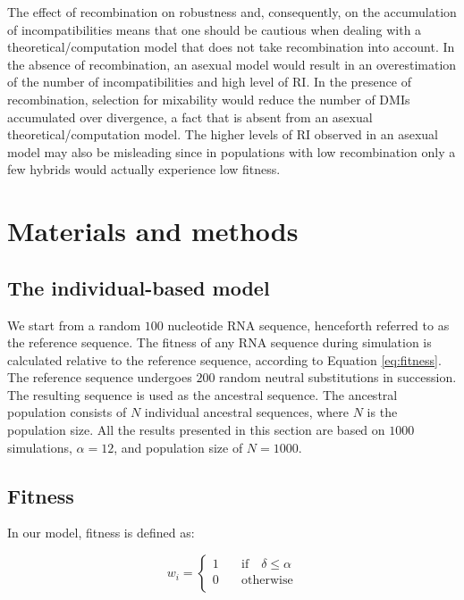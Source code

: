 \documentclass[10pt,letterpaper]{article}
\begin{document}
The effect of recombination on robustness and, consequently, on the accumulation of incompatibilities means that one should be cautious when dealing with a theoretical/computation model that does not take recombination into account. In the absence of recombination, an asexual model would result in an overestimation of the number of incompatibilities and high level of RI. In the presence of recombination, selection for mixability would reduce the number of DMIs accumulated over divergence, a fact that is absent from an asexual theoretical/computation model. The higher levels of RI observed in an asexual model may also be misleading since in populations with low recombination only a few hybrids would actually experience low fitness.

\section*{Materials and methods}

\subsection*{The individual-based model}

We start from a random $100$ nucleotide RNA sequence, henceforth referred to as the reference sequence. The fitness of any RNA sequence during simulation is calculated relative to the reference sequence, according to Equation \ref{eq:fitness}. The reference sequence undergoes $200$ random neutral substitutions in succession. The resulting sequence is used as the ancestral sequence. The ancestral population consists of $N$ individual ancestral sequences, where $N$ is the population size. All the results presented in this section are based on $1000$ simulations, $\alpha = 12$, and population size of $N=1000$.

\subsection*{Fitness} 

In our model, fitness is defined as:

\begin{equation}
	w_{i} = \left\{\begin{array}{ll}
    		1 & \quad  \mathrm{if}  \quad  \delta \leqslant \alpha\\
			0 & \quad  \mathrm{otherwise}   \\
			\end{array}\right.
\label{eq:fitness}
\end{equation} 
\end{document}
